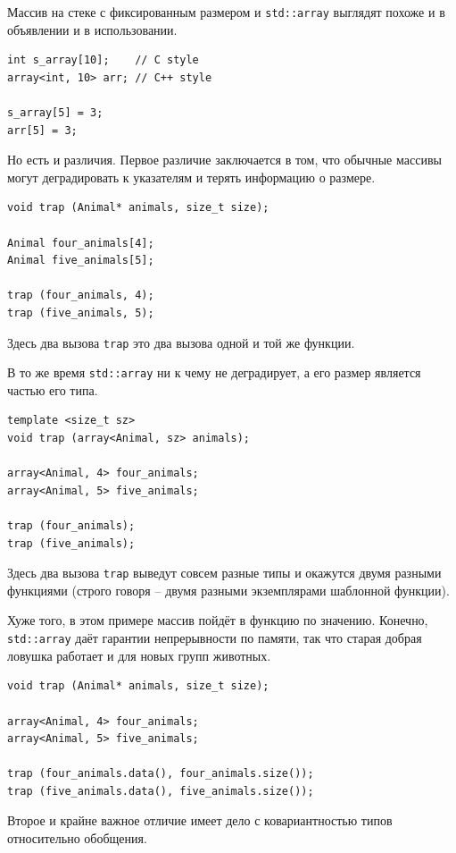 \documentclass[a4paper,12pt,oneside]{article}
\begin{document}
Массив на стеке с фиксированным размером и \lstinline!std::array! выглядят похоже и в объявлении и в использовании.

\begin{lstlisting}
int s_array[10];    // C style
array<int, 10> arr; // C++ style

s_array[5] = 3;
arr[5] = 3;
\end{lstlisting}

Но есть и различия. Первое различие заключается в том, что обычные массивы могут деградировать к указателям и терять информацию о размере.

\begin{lstlisting}
void trap (Animal* animals, size_t size);

Animal four_animals[4];
Animal five_animals[5];

trap (four_animals, 4);
trap (five_animals, 5);
\end{lstlisting}

Здесь два вызова \lstinline!trap! это два вызова одной и той же функции.

В то же время \lstinline!std::array! ни к чему не деградирует, а его размер является частью его типа.

\begin{lstlisting}
template <size_t sz> 
void trap (array<Animal, sz> animals);

array<Animal, 4> four_animals;
array<Animal, 5> five_animals;

trap (four_animals);
trap (five_animals);
\end{lstlisting}

Здесь два вызова \lstinline!trap! выведут совсем разные типы и окажутся двумя разными функциями (строго говоря -- двумя разными экземплярами шаблонной функции).

Хуже того, в этом примере массив пойдёт в функцию по значению. Конечно, \lstinline!std::array! даёт гарантии непрерывности по памяти, так что старая добрая ловушка работает и для новых групп животных.

\begin{lstlisting}
void trap (Animal* animals, size_t size);

array<Animal, 4> four_animals;
array<Animal, 5> five_animals;

trap (four_animals.data(), four_animals.size());
trap (five_animals.data(), five_animals.size());
\end{lstlisting}

Второе и крайне важное отличие имеет дело с ковариантностью типов относительно обобщения.
\end{document}

